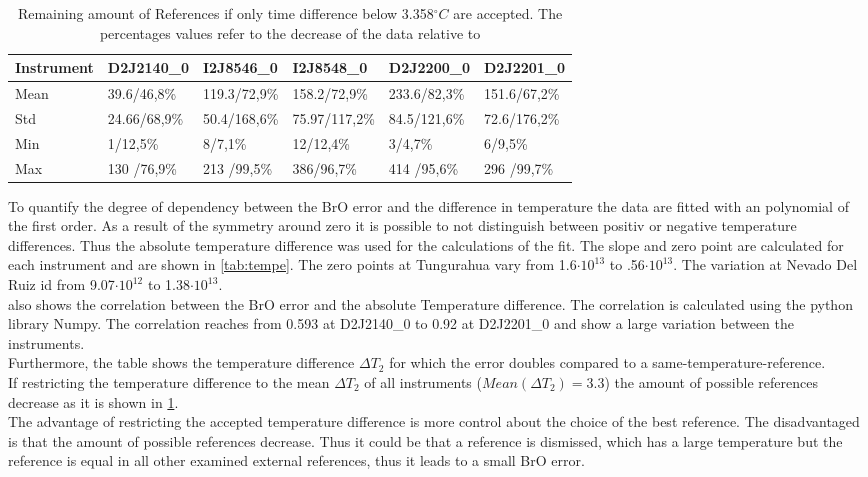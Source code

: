 \documentclass  [
  paper    = a4,
  BCOR     = 10mm,
  twoside,
  fontsize = 12pt,
  fleqn,
  toc      = bibnumbered,
  toc      = listofnumbered,
  numbers  = noendperiod,
  headings = normal,
  listof   = leveldown,
  version  = 3.03
]                                       {scrreprt}
\begin{document}
	\begin{table}
	\begin{tabular}{|p{2cm}|p{2cm}|p{2cm}|p{2cm}|p{2cm}|p{2cm}|}
		Instrument	&D2J2140\_0&I2J8546\_0& I2J8548\_0&D2J2200\_0&D2J2201\_0\\
		\toprule
		Mean&
		39.6/46,8\%&
		119.3/72,9\%
		&158.2/72,9\%
		&233.6/82,3\%
		&151.6/67,2\%\\
		\midrule
		Std&
		24.66/68,9\%&
		50.4/168,6\%&
		75.97/117,2\%&
		84.5/121,6\%&
		72.6/176,2\%\\
		\midrule
		Min&
		1/12,5\%
		&8/7,1\%&
		12/12,4\%&
		3/4,7\% &
		6/9,5\%\\
		\midrule
		Max
		&
		130	/76,9\%&
		213	/99,5\%&
		386/96,7\%&
		414	/95,6\% &
		296	/99,7\%\\
		\bottomrule
	\end{tabular}
	\caption{Remaining amount of References if only time difference below 3.358$^{\circ}C$ are accepted. The percentages values refer to the decrease of the data relative to }
	\label{tab:decTemp}
	\end{table}	
To quantify the degree of dependency between the BrO error and the difference in temperature the data are fitted with an polynomial of the first order. As a result of the symmetry around zero it is possible to not distinguish between positiv or negative temperature differences. Thus the absolute temperature difference was used for the calculations of the fit. The slope and zero point are calculated for each instrument and are shown in \cref{tab:tempe}. 
The zero points at Tungurahua vary from 1.6$\cdot10^{13}$ to .56$\cdot10^{13}$. The variation at Nevado Del Ruiz id from  9.07$\cdot10^{12}$ to 1.38$\cdot10^{13}$.\\
 also shows the correlation between the BrO error and the absolute Temperature difference.
The correlation is calculated using the python library Numpy. The correlation reaches from 0.593 at D2J2140\_0 to  0.92 at D2J2201\_0 and show a large variation between the instruments.\\
Furthermore, the table shows the temperature difference  $\Delta T_{2}$  for which the error doubles compared to a same-temperature-reference.\\
If restricting the temperature difference to the mean $\Delta T_{2}$ of all instruments
($Mean(\Delta T_{2}) = 3.3$) the amount of possible references decrease as it is shown in \cref{tab:decTemp}.\\
The advantage of restricting the accepted temperature difference is more control about the choice of the best reference. The disadvantaged is that the amount of possible references decrease. Thus it could be that a reference is dismissed, which has a large temperature but the reference is equal in all other examined external references, thus it leads to a small BrO error.\\
\end{document}
